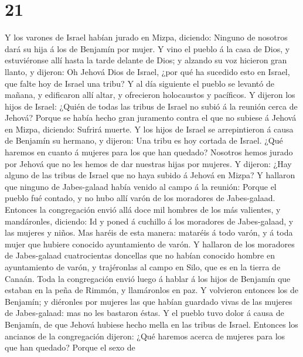 \hypertarget{section-20}{%
\section{21}\label{section-20}}

 Y los varones de Israel habían jurado en Mizpa, diciendo:
Ninguno de nosotros dará su hija á los de Benjamín por mujer.
 Y vino el pueblo á la casa de Dios, y estuviéronse allí
hasta la tarde delante de Dios; y alzando su voz hicieron gran llanto, y
dijeron:  Oh Jehová Dios de Israel, ¿por qué ha sucedido
esto en Israel, que falte hoy de Israel una tribu?  Y al día
siguiente el pueblo se levantó de mañana, y edificaron allí altar, y
ofrecieron holocaustos y pacíficos.  Y dijeron los hijos de
Israel: ¿Quién de todas las tribus de Israel no subió á la reunión cerca
de Jehová? Porque se había hecho gran juramento contra el que no subiese
á Jehová en Mizpa, diciendo: Sufrirá muerte.  Y los hijos de
Israel se arrepintieron á causa de Benjamín su hermano, y dijeron: Una
tribu es hoy cortada de Israel.  ¿Qué haremos en cuanto á
mujeres para los que han quedado? Nosotros hemos jurado por Jehová que
no les hemos de dar nuestras hijas por mujeres.  Y dijeron:
¿Hay alguno de las tribus de Israel que no haya subido á Jehová en
Mizpa? Y hallaron que ninguno de Jabes-galaad había venido al campo á la
reunión:  Porque el pueblo fué contado, y no hubo allí varón
de los moradores de Jabes-galaad.  Entonces la congregación
envió allá doce mil hombres de los más valientes, y mandáronles,
diciendo: Id y poned á cuchillo á los moradores de Jabes-galaad, y las
mujeres y niños.  Mas haréis de esta manera: mataréis á
todo varón, y á toda mujer que hubiere conocido ayuntamiento de varón.
 Y hallaron de los moradores de Jabes-galaad cuatrocientas
doncellas que no habían conocido hombre en ayuntamiento de varón, y
trajéronlas al campo en Silo, que es en la tierra de Canaán.
 Toda la congregación envió luego á hablar á los hijos de
Benjamín que estaban en la peña de Rimmón, y llamáronlos en paz.
 Y volvieron entonces los de Benjamín; y diéronles por
mujeres las que habían guardado vivas de las mujeres de Jabes-galaad:
mas no les bastaron éstas.  Y el pueblo tuvo dolor á causa
de Benjamín, de que Jehová hubiese hecho mella en las tribus de Israel.
 Entonces los ancianos de la congregación dijeron: ¿Qué
haremos acerca de mujeres para los que han quedado? Porque el sexo de

